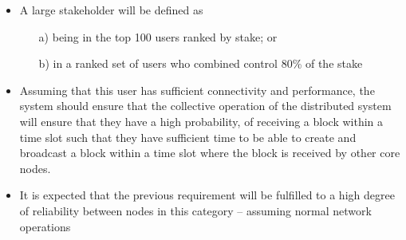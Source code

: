 \documentclass{report}
\theoremstyle{definition}{
  \newtheorem{lemma}{Lemma}[section] %
  \newtheorem{definition}[lemma]{Definition}
}
\theoremstyle{theorem}{
  \newtheorem{invariant}[lemma]{Invariant}
  \newtheorem{proofobligation}[lemma]{Proof Obligation}
}
\numberwithin{equation}{lemma}
\begin{document}
\begin{itemize}
\item A large stakeholder will be defined as
      \begin{itemize}
      \item[a)] being in the top 100 users ranked by stake; or
      \item[b)] in a ranked set of users who combined control 80\% of the stake
      \end{itemize}
\item Assuming that this user has sufficient connectivity and performance, the
      system should ensure that the collective operation of the distributed
      system will ensure that they have a high probability, of receiving a
      block within a time slot such that they have sufficient time to be able
      to create and broadcast a block within a time slot where the block is
      received by other core nodes.
\item It is expected that the previous requirement will be fulfilled to a high
      degree of reliability between nodes in this category -- assuming normal
      network operations


\end{itemize}
\end{document}
